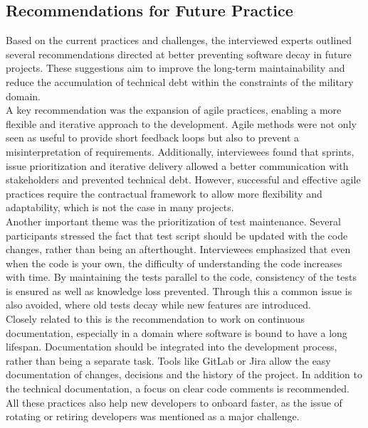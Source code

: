 \subsection{Recommendations for Future Practice}
Based on the current practices and challenges, the interviewed experts outlined several recommendations directed at better preventing software decay in future projects. These suggestions aim to improve the long-term maintainability
and reduce the accumulation of technical debt within the constraints of the military domain.\\

A key recommendation was the expansion of agile practices, enabling a more flexible and iterative approach to the development. Agile methods were not only seen as useful to provide short feedback loops but also to prevent a misinterpretation of requirements.
Additionally, interviewees found that sprints, issue prioritization and iterative delivery allowed a better communication with stakeholders and prevented technical debt.
However, successful and effective agile practices require the contractual framework to allow more flexibility and adaptability, which is not the case in many projects.\\

Another important theme was the prioritization of test maintenance. Several participants stressed the fact that test script should be updated with the code changes, rather than being an afterthought.
Interviewees emphasized that even when the code is your own, the difficulty of understanding the code increases with time. By maintaining the tests parallel to the code, consistency of the tests is ensured as well as knowledge loss prevented.
Through this a common issue is also avoided, where old tests decay while new features are introduced.\\

Closely related to this is the recommendation to work on continuous documentation, especially in a domain where software is bound to have a long lifespan. Documentation should be integrated into the development process, rather than being a separate task.
Tools like GitLab or Jira allow the easy documentation of changes, decisions and the history of the project. In addition to the technical documentation, a focus on clear code comments is recommended.
All these practices also help new developers to onboard faster, as the issue of rotating or retiring developers was mentioned as a major challenge.\\

